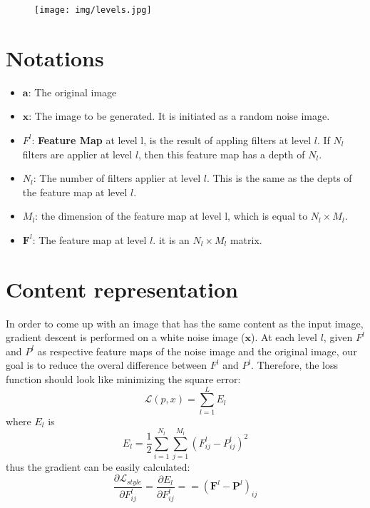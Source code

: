 \documentclass{article}
\begin{document}
\doublespacing
\setlength{\parindent}{0pt} %


\begin{figure}[H]
    \centering
    \texttt{[image: img/levels.jpg]}
    \caption*{}
\end{figure}
\section*{Notations}
\begin{itemize}
    \item $\mathbf{a}$: The original image
    \item $\mathbf{x}$: The image to be generated. It is initiated as
        a random noise image.
    \item $F^l$: \textbf{Feature Map} at level l, is the result of appling filters at level $l$.
        If $N_l$ filters are applier at level $l$, then this feature
        map has a depth of $N_l$.
    \item $N_l$: The number of filters applier at level $l$. This is
        the same as the depts of the feature map at level
        $l$.
    \item $M_l$: the dimension of the feature map at level l, which
        is equal to $N_l \times M_l$.
    \item $\mathbf{F}^l$: The feature map at level $l$. it is an
        $N_l \times M_l$ matrix.
\end{itemize}
\section*{Content representation}
In order to come up with an image that has the same content as the input
image, gradient descent is performed on a white noise image ($\mathbf{x}$).
At each level $l$, given $F^l$ and $P^l$ as respective feature maps of the
noise image and the original image, our goal is to reduce the overal difference
between $F^l$ and $P^l$. Therefore, the loss function should look like
minimizing the square error:
\begin{equation}
    \mathcal{L}(p, x) = \sum_{l=1}^{L} {E_l}
\end{equation}
where $E_l$ is
\begin{equation}
    {E_l} = \frac{1}{2} \sum_{i=1}^{N_l}\sum_{j=1}^{M_l}{(F^l_{ij} - P^l_{ij})^2}
\end{equation}
thus the gradient can be easily calculated:
\begin{equation}
    \frac{\partial \mathcal{L}_{style}}{\partial F^l_{ij}} = \frac{\partial E_l}{\partial F^l_{ij}} =
    = (\mathbf{F}^l - \mathbf{P}^l)_{ij}
\end{equation}
\end{document}
